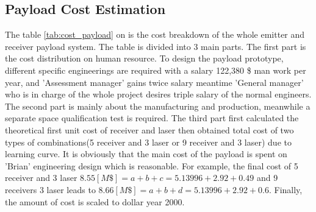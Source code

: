 \subsection{Payload Cost Estimation}
\label{cost}
The table \ref{tab:cost_payload} on \pageref{tab:cost_payload} is the cost breakdown of the whole emitter and receiver payload system. The table is divided into 3 main parts. The first part is the cost distribution on human resource. To design the payload prototype, different specific engineerings are required with a salary 122,380 \$ man work per year\cite{engineering_salary}, and 'Assessment manager' gains twice salary meantime 'General manager' who is in charge of the whole project desires triple salary of the normal engineers. The second part is mainly about the manufacturing and production, meanwhile a separate space qualification test is required. The third part first calculated the theoretical first unit cost of receiver and \acs{laser} then obtained total cost of two types of combinations(5 receiver and 3 \acs{laser} or 9 receiver and 3 \acs{laser}) due to learning curve\cite{Space2B}. It is obviously that the main cost of the payload is spent on 'Brian' engineering design which is reasonable. For example, the final cost of 5 receiver and 3 \acs{laser} $8.55 [M\$] = a + b + c = 5.13996 + 2.92 + 0.49$ and 9 receivers 3 \acs{laser} leads to $8.66 [M\$] = a + b + d = 5.13996 + 2.92 + 0.6$. Finally, the amount of cost is scaled to dollar year 2000.

